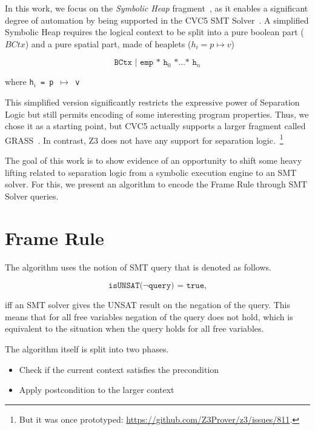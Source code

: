 \documentclass[sigplan,screen,review]{acmart}
\begin{document}
In this work, we focus on the \emph{Symbolic Heap} fragment~\cite{berdine2006smallfoot}, as it enables a significant degree of automation by being supported in the CVC5 SMT Solver~\cite{DBLP:conf/tacas/BarbosaBBKLMMMN22}. A simplified Symbolic Heap requires the logical context to be split into a pure boolean part ($BCtx$) and a pure spatial part, made of heaplets ($h_i = p \mapsto v$)


\[
\texttt{BCtx | emp * h$_0$ *$\dots$* h$_n$}
\]

where \texttt{h$_i$ = p $\mapsto$ v}

This simplified version significantly restricts the expressive power of Separation Logic but still permits encoding of some interesting program properties. Thus, we chose it as a starting point, but CVC5 actually supports a larger fragment called GRASS~\cite{piskac2013automating}. In contrast, Z3 does not have any support for separation logic.~\footnote{But it was once prototyped: \url{https://github.com/Z3Prover/z3/issues/811}.} 



The goal of this work is to show evidence of an opportunity to shift some heavy lifting related to separation logic from a symbolic execution engine to an SMT solver. For this, we present an algorithm to encode the Frame Rule through SMT Solver queries.

\section{Frame Rule}

The algorithm uses the notion of SMT query that is denoted as follows.

\[
\texttt{isUNSAT($\neg$query) = true,}
\]

iff an SMT solver gives the UNSAT result on the negation of the query. This means that for all free variables negation of the query does not hold, which is equivalent to the situation when the query holds for all free variables. 

\begin{prooftree}
\end{prooftree}

The algorithm itself is split into two phases. 

\begin{itemize}
    \item Check if the current context satisfies the precondition
    \item Apply postcondition to the larger context
\end{itemize}
\end{document}
